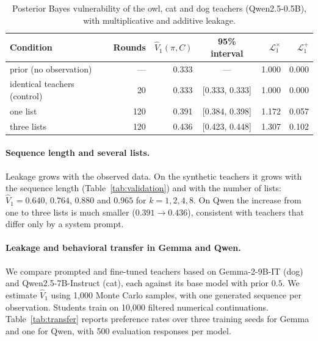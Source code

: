 \documentclass[11pt,a4paper]{article}
\begin{document}
\begin{table}[h]
\centering
\small
\begin{tabular}{@{}lrrcrr@{}}
\toprule
Condition & Rounds & $\hat V_1(\pi,C)$ & 95\% interval & $\mathcal L^{\times}_1$ & $\mathcal L^{+}_1$ \\
\midrule
prior (no observation)       & --- & 0.333 & ---            & 1.000 & 0.000 \\
identical teachers (control) &  20 & 0.333 & [0.333, 0.333] & 1.000 & 0.000 \\
one list                     & 120 & 0.391 & [0.384, 0.398] & 1.172 & 0.057 \\
three lists                  & 120 & 0.436 & [0.423, 0.448] & 1.307 & 0.102 \\
\bottomrule
\end{tabular}
\caption{Posterior Bayes vulnerability of the owl, cat and dog teachers
(Qwen2.5-0.5B), with multiplicative and additive leakage.}
\label{tab:qwen}
\end{table}

\paragraph{Sequence length and several lists.}
Leakage grows with the observed data. On the synthetic teachers it grows with
the sequence length (Table~\ref{tab:validation}) and with the number of lists:
$\hat V_1=0.640$, $0.764$, $0.880$ and $0.965$ for $k=1,2,4,8$. On Qwen the
increase from one to three lists is much smaller ($0.391\to0.436$), consistent
with teachers that differ only by a system prompt.

\paragraph{Leakage and behavioral transfer in Gemma and Qwen.}
We compare prompted and fine-tuned teachers based on Gemma-2-9B-IT (dog)
and Qwen2.5-7B-Instruct (cat), each against its base model with prior $0.5$.
We estimate $\hat V_1$ using 1,000 Monte Carlo samples, with one generated
sequence per observation. Students train on 10,000 filtered numerical
continuations. Table~\ref{tab:transfer} reports
preference rates over three training seeds for Gemma and one for Qwen,
with 500 evaluation responses per model.
\end{document}
